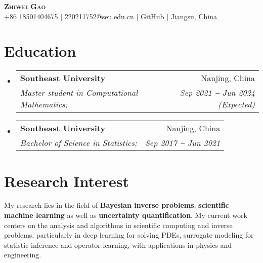 \documentclass[letterpaper,11pt]{article}
\makeatletter
\newcommand{\resumeSubheading}[4]{
  \vspace{-2pt}\item
    \begin{tabular*}{0.97\textwidth}[t]{l@{\extracolsep{\fill}}r}
      \textbf{#1} & #2 \\
      \textit{\small#3} & \textit{\small #4} \\
    \end{tabular*}\vspace{-7pt}
}
\newcommand{\resumeEducationHeading}[4]{
  \vspace{-2pt}\item
    \begin{tabular*}{0.97\textwidth}[t]{l@{\extracolsep{\fill}}r}
      \textbf{#1} & #2 \\
      \textit{\small#3} & \textit{\small #4} \\
    \end{tabular*}\vspace{-5pt}
}
\newcommand{\resumeSubHeadingListStart}{\begin{itemize}[leftmargin=0.15in, label={}]}
\newcommand{\resumeSubHeadingListEnd}{\end{itemize}}
\makeatother
\begin{document}

\begin{center}
  \textbf{\Huge \scshape Zhiwei Gao} \\ \vspace{3pt}
  \small
  \faMobile \hspace{.5pt} \href{tel:18501404675}{+86 18501404675}
  $|$
  \faAt \hspace{.5pt} \href{mailto:220211752@seu.edu.cn}{220211752@seu.edu.cn}
  $|$
  \faGithub \hspace{.5pt} \href{https://github.com/gaozhiweiPHD}{GitHub}
  $|$
  \faMapMarker \hspace{.5pt} \href{https://www.google.com/maps/search/Southeast+University/@31.88806,118.8138471,17z/data=!3m1!4b1?entry=ttu}{Jiangsu, China}
\end{center}




\section{Education}
  \vspace{3pt}
  \resumeSubHeadingListStart
    
    \resumeEducationHeading
      {Southeast University
      }{Nanjing, China}
      {Master student in Computational Mathematics;}{Sep 2021 \textbf{--} Jun 2024 (Expected)}
    \resumeSubheading
      {Southeast University
      }{Nanjing, China}
      {Bachelor of Science in Statistics; }{Sep 2017 \textbf{--} Jun 2021}
    
  \resumeSubHeadingListEnd




\section{Research Interest}
  \vspace{3pt}
  My research lies in the field of \textbf{\textbf{Bayesian inverse problems}}, \textbf{\textbf{scientific machine learning}} as well as \textbf{\textbf{uncertainty quantification}}. My current work centers on the analysis and algorithms in scientific computing and inverse problems, particularly in deep learning for solving PDEs, surrogate modeling for statistic inference and operator learning, with applications in physics and engineering.
\end{document}
